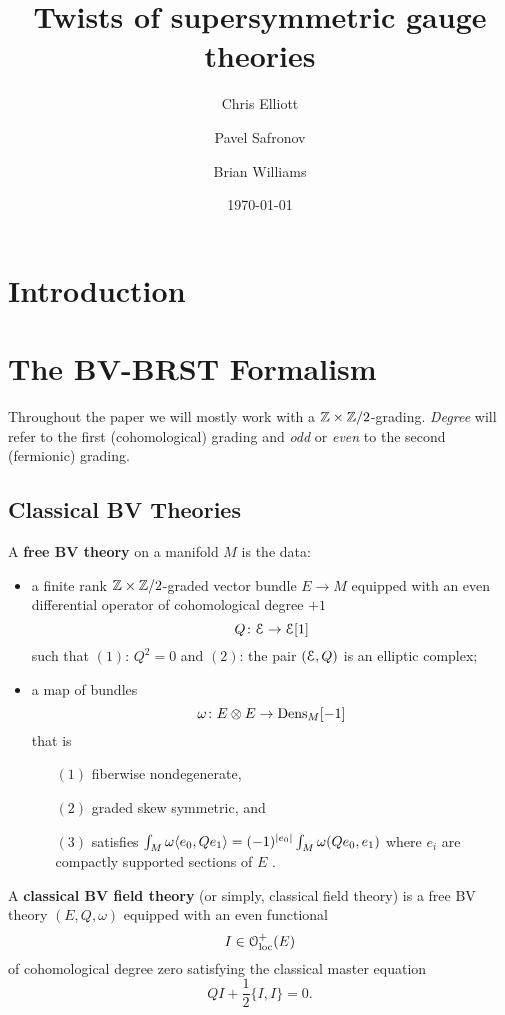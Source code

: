 \documentclass[10pt, oneside]{article}
\title{Twists of supersymmetric gauge theories}
\author{Chris Elliott\and Pavel Safronov \and Brian Williams}
\date{\today}
\begin{document}
\maketitle

\section*{Introduction}

\section{The BV-BRST Formalism}

Throughout the paper we will mostly work with a $\mathbb Z\times\mathbb Z/2$-grading. \emph{Degree} will refer to the first (cohomological) grading and \emph{odd} or \emph{even} to the second (fermionic) grading.

\subsection{Classical BV Theories}

\begin{dfn}
A {\bf free BV theory} on a manifold $M$ is the data:
\begin{itemize}
\item a finite rank $\mathbb Z\times\mathbb Z/2$-graded vector bundle $E \to M$ equipped with an even differential operator of cohomological degree $+1$
\[
Q \colon \mathcal E \to \mathcal E [1] 
\]
such that $(1)$: $Q^2 = 0$ and $(2)$: the pair $(\mathcal E , Q)$ is an elliptic complex;
\item a map of bundles
\[
\omega\colon E \otimes E \to {\rm Dens}_M [-1]
\]
that is
\begin{enumerate}
\item[$(1)$] fiberwise nondegenerate,
\item[$(2)$] graded skew symmetric, and
\item[$(3)$] satisfies $\int_M \omega\langle e_0, Q e_1\rangle = (-1)^{|e_0|} \int_M \omega(Q e_0, e_1)$ where $e_i$ are compactly supported sections of $E$ .
\end{enumerate}
\end{itemize}
\end{dfn}


\begin{dfn}
A {\bf classical BV field theory} (or simply, classical field theory) is a free BV theory $(E, Q, \omega)$ equipped with an even functional
\[
I \in \mathcal{O}_{\rm loc}^+(E)
\]
of cohomological degree zero satisfying the classical master equation 
\[
Q I + \frac{1}{2} \{I,I\} = 0 .
\]
\end{dfn}
\end{document}
